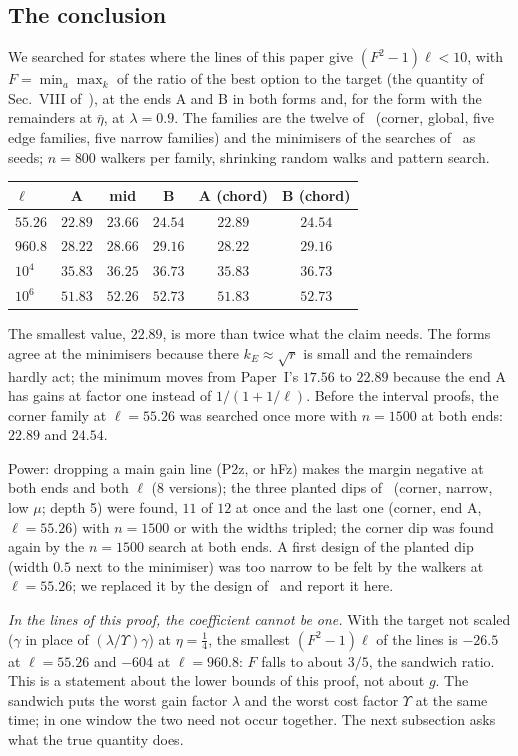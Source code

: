 \subsection{The conclusion}
We searched for states where the lines of this paper give $(F^2-1)\ell<10$, with $F=\min_a\max_k$ of the ratio of the best option to the target (the quantity of Sec.~VIII of~\cite{I}), at the ends A and B in both forms and, for the form with the remainders at $\bar\eta$, at $\lambda=0.9$.
The families are the twelve of~\cite{I} (corner, global, five edge families, five narrow families) and the minimisers of the searches of~\cite{I} as seeds; $n=800$ walkers per family, shrinking random walks and pattern search.
\begin{center}
\small
\begin{tabular}{lccccc}
$\ell$ & A & mid & B & A (chord) & B (chord)\\ \hline
$55.26$ & $22.89$ & $23.66$ & $24.54$ & $22.89$ & $24.54$\\
$960.8$ & $28.22$ & $28.66$ & $29.16$ & $28.22$ & $29.16$\\
$10^4$ & $35.83$ & $36.25$ & $36.73$ & $35.83$ & $36.73$\\
$10^6$ & $51.83$ & $52.26$ & $52.73$ & $51.83$ & $52.73$\\
\end{tabular}
\end{center}
The smallest value, $22.89$, is more than twice what the claim needs.
The forms agree at the minimisers because there $k_E\approx\sqrt r$ is small and the remainders hardly act; the minimum moves from Paper~I's $17.56$ to $22.89$ because the end A has gains at factor one instead of $1/(1+1/\ell)$.
Before the interval proofs, the corner family at $\ell=55.26$ was searched once more with $n=1500$ at both ends: $22.89$ and $24.54$.

Power: dropping a main gain line (P2z, or hFz) makes the margin negative at both ends and both $\ell$ (8 versions); the three planted dips of~\cite{I} (corner, narrow, low $\mu$; depth 5) were found, $11$ of $12$ at once and the last one (corner, end A, $\ell=55.26$) with $n=1500$ or with the widths tripled; the corner dip was found again by the $n=1500$ search at both ends.
A first design of the planted dip (width $0.5$ next to the minimiser) was too narrow to be felt by the walkers at $\ell=55.26$; we replaced it by the design of~\cite{I} and report it here.

\emph{In the lines of this proof, the coefficient cannot be one.}
With the target not scaled ($\gamma$ in place of $(\lambda/\Upsilon)\gamma$) at $\eta=\tfrac14$, the smallest $(F^2-1)\ell$ of the lines is $-26.5$ at $\ell=55.26$ and $-604$ at $\ell=960.8$: $F$ falls to about $3/5$, the sandwich ratio.
This is a statement about the lower bounds of this proof, not about $g$.
The sandwich puts the worst gain factor $\lambda$ and the worst cost factor $\Upsilon$ at the same time; in one window the two need not occur together.
The next subsection asks what the true quantity does.

